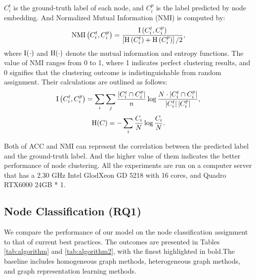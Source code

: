 $C_i^t$ is the ground-truth label of each node, and $C_i^p$ is the label predicted by node embedding. And Normalized Mutual Information (NMI) is computed by:
\begin{equation}
\textnormal{NMI}\left(C_i^t, C_i^p\right)=\frac{\textnormal{I}\left(C_i^t, C_i^p\right)}{\left[\textnormal{H}\left(C_i^t\right)+\textnormal{H}\left(C_i^p\right)\right] / 2},
\end{equation}
where $\textnormal{I}(\cdot)$ and $\textnormal{H}(\cdot)$ denote the mutual information and entropy functions. 
The value of NMI ranges from 0 to 1, where 1 indicates perfect clustering results, and 0 signifies that the clustering outcome is indistinguishable from random assignment.
Their calculations are outlined as follows:
\begin{equation}
\textnormal{I}\left(C_i^t, C_i^p\right)=\sum_i \sum_j \frac{\left|C_i^t \cap C_i^p\right|}{n} \log \frac{N \cdot\left|C_i^t \cap C_i^p\right|}{\left|C_i^t\right|\left|C_i^p\right|} \\,
\end{equation}
\begin{equation}
    \textnormal{H}(C)=-\sum_i \frac{C_i}{N} \log \frac{C_i}{N}.
\end{equation}

Both of ACC and NMI can represent the correlation between the predicted label and the ground-truth label. 
%
And the higher value of them indicates the better performance of node clustering.
%
All the experiments are run on a computer server that has a 2.30 GHz Intel GlodXeon GD 5218 with 16 cores, and Quadro RTX6000 24GB * 1.


\subsection{Node Classification (\textbf{RQ1})} \label{sec:node}
We compare the performance of our model on the node classification assignment to that of current best practices. The outcomes are presented in Tables \ref{tab:algorithm} and \ref{tab:algorithm2}, with the finest highlighted in bold.The baseline includes homogeneous graph methods, heterogeneous graph methods, and graph representation learning methods.


